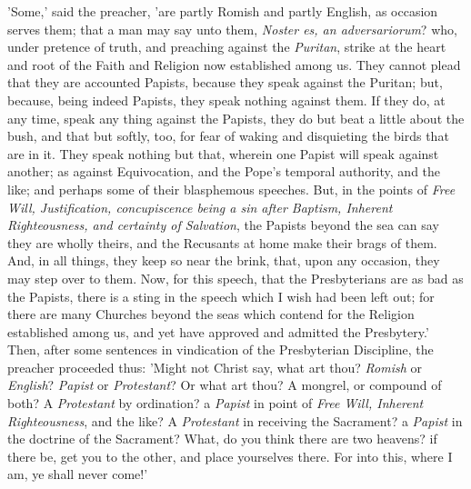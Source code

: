 'Some,' said the preacher, 'are
partly Romish and partly English, as occasion serves them; that a man
may say unto them, \emph{Noster es, an adversariorum}? who, under
pretence of truth, and preaching against the \emph{Puritan}, strike at
the heart and root of the Faith and Religion now established among us.
They cannot plead that they are accounted Papists, because they speak
against the Puritan; but, because, being indeed Papists, they speak
nothing against them. If they do, at any time, speak any thing against
the Papists, they do but beat a little about the bush, and that but
softly, too, for fear of waking and disquieting the birds that are in
it. They speak nothing but that, wherein one Papist will speak against
another; as against Equivocation, and the Pope's temporal authority, and
the like; and perhaps some of their blasphemous speeches. But, in the
points of \emph{Free Will, Justification, concupiscence being a sin after
Baptism, Inherent Righteousness, and certainty of Salvation}, the
Papists beyond the sea can say they are wholly theirs, and the Recusants
at home make their brags of them. And, in all
things, they keep so near the brink, that, upon any occasion, they may
step over to them. Now, for this speech, that the Presbyterians are as
bad as the Papists, there is a sting in the speech which I wish had been
left out; for there are many Churches beyond the seas which contend for
the Religion established among us, and yet have approved and admitted
the Presbytery.' Then, after some sentences in vindication of the
Presbyterian Discipline, the preacher proceeded thus: 'Might not Christ
say, what art thou? \emph{Romish} or \emph{English}? \emph{Papist} or \emph{Protestant}?
Or what art thou? A mongrel, or compound of both? A \emph{Protestant} by
ordination? a \emph{Papist} in point of \emph{Free Will, Inherent
Righteousness}, and the like? A \emph{Protestant} in receiving the
Sacrament? a \emph{Papist} in the doctrine of the Sacrament? What, do
you think there are two heavens? if there be, get you to the other, and
place yourselves there. For into this, where I am, ye shall never come!'


